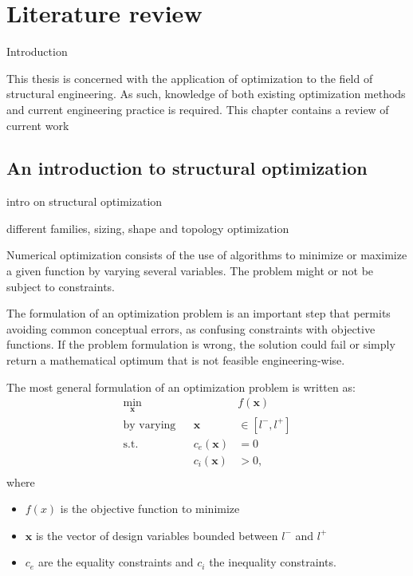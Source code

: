 \setchapterpreamble[u]{\margintoc}
\glsresetall %

\chapter{Literature review}
Introduction

This thesis is concerned with the application of optimization to the field of structural engineering. As such, knowledge of both existing optimization methods and current engineering practice is required. This chapter contains a review of current work

\section{An introduction to structural optimization}

intro on structural optimization

different families, sizing, shape and topology optimization

Numerical optimization consists of the use of algorithms to minimize or maximize a given function by varying several variables. The problem might or not be subject to constraints.

The formulation of an optimization problem is an important step that permits avoiding common conceptual errors, as confusing constraints with objective functions. If the problem formulation is wrong, the solution could fail or simply return a mathematical optimum that is not feasible engineering-wise.

The most general formulation of an optimization problem is written as:
\begin{equation}
    \begin{aligned}
    \min_{\bm{x}}         && & f(\bm{x})\\
    \textrm{by varying}   && \bm{x} &\in [l^-,l^+] \\
    \textrm{s.t.}   && c_e(\bm{x}) &= 0 \\
    && c_i(\bm{x}) &> 0, \\
    \end{aligned}
\end{equation}
where 
\begin{itemize}
    \item $ f(x) $ is the objective function to minimize
    \item $ \bm{x} $ is the vector of design variables bounded between $ l^- $ and $ l^+ $
    \item $c_e$ are the equality constraints and $c_i$ the inequality constraints.
\end{itemize}

